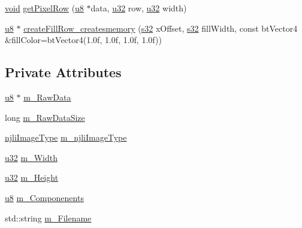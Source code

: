 \begin{DoxyCompactItemize}
\item 
\mbox{\hyperlink{_thread_8h_af1e856da2e658414cb2456cb6f7ebc66}{void}} \mbox{\hyperlink{classnjli_1_1_image_a1d1a40ff4c30f776b445f3ac003de70e}{get\+Pixel\+Row}} (\mbox{\hyperlink{_util_8h_aed742c436da53c1080638ce6ef7d13de}{u8}} $\ast$data, \mbox{\hyperlink{_util_8h_a10e94b422ef0c20dcdec20d31a1f5049}{u32}} row, \mbox{\hyperlink{_util_8h_a10e94b422ef0c20dcdec20d31a1f5049}{u32}} width)
\item 
\mbox{\hyperlink{_util_8h_aed742c436da53c1080638ce6ef7d13de}{u8}} $\ast$ \mbox{\hyperlink{classnjli_1_1_image_a5d0a48ebc99d07bab0a06967d362fe5c}{create\+Fill\+Row\+\_\+createsmemory}} (\mbox{\hyperlink{_util_8h_aa62c75d314a0d1f37f79c4b73b2292e2}{s32}} x\+Offset, \mbox{\hyperlink{_util_8h_aa62c75d314a0d1f37f79c4b73b2292e2}{s32}} fill\+Width, const bt\+Vector4 \&fill\+Color=bt\+Vector4(1.\+0f, 1.\+0f, 1.\+0f, 1.\+0f))
\end{DoxyCompactItemize}
\subsection*{Private Attributes}
\begin{DoxyCompactItemize}
\item 
\mbox{\hyperlink{_util_8h_aed742c436da53c1080638ce6ef7d13de}{u8}} $\ast$ \mbox{\hyperlink{classnjli_1_1_image_a15158bdf19f840193dca9df44bf9e348}{m\+\_\+\+Raw\+Data}}
\item 
long \mbox{\hyperlink{classnjli_1_1_image_af97facbdedc7d4ad1e9831cc7b3d6300}{m\+\_\+\+Raw\+Data\+Size}}
\item 
\mbox{\hyperlink{namespacenjli_a709a24b63b768ce1cdff54f7f48d3c0b}{njli\+Image\+Type}} \mbox{\hyperlink{classnjli_1_1_image_ae4ede32142eb6433f3db385a0e7bdd80}{m\+\_\+njli\+Image\+Type}}
\item 
\mbox{\hyperlink{_util_8h_a10e94b422ef0c20dcdec20d31a1f5049}{u32}} \mbox{\hyperlink{classnjli_1_1_image_a784a866596cacd15f4ddb59a0b56f78c}{m\+\_\+\+Width}}
\item 
\mbox{\hyperlink{_util_8h_a10e94b422ef0c20dcdec20d31a1f5049}{u32}} \mbox{\hyperlink{classnjli_1_1_image_ac4709639cbda0dab2a74ffd6a7466026}{m\+\_\+\+Height}}
\item 
\mbox{\hyperlink{_util_8h_aed742c436da53c1080638ce6ef7d13de}{u8}} \mbox{\hyperlink{classnjli_1_1_image_a313f2d8768b456631e6124eb23c1e4b6}{m\+\_\+\+Componenents}}
\item 
std\+::string \mbox{\hyperlink{classnjli_1_1_image_a86539a463f9a77d3960a9d7c658cc882}{m\+\_\+\+Filename}}
\end{DoxyCompactItemize}
